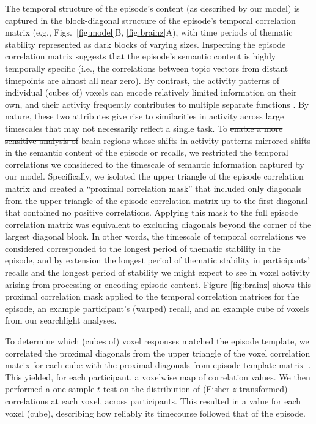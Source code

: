 \documentclass[10pt]{article}
\renewcommand{\includegraphics}[2][]{} %
\providecommand{\DIFaddtex}[1]{{\protect\color{blue}\uwave{#1}}} %
\providecommand{\DIFdeltex}[1]{{\protect\color{red}\sout{#1}}}                      %
\providecommand{\DIFaddbegin}{} %
\providecommand{\DIFaddend}{} %
\providecommand{\DIFdelbegin}{} %
\providecommand{\DIFdelend}{} %
\providecommand{\DIFadd}[1]{\texorpdfstring{\DIFaddtex{#1}}{#1}} %
\providecommand{\DIFdel}[1]{\texorpdfstring{\DIFdeltex{#1}}{}} %
\newcommand{\DIFscaledelfig}{0.5}
\newlength{\DIFdelgraphicswidth} %
\newlength{\DIFdelgraphicsheight} %
\newcommand{\DIFaddincludegraphics}[2][]{{\color{blue}\fbox{\DIFOincludegraphics[#1]{#2}}}} %
\newcommand{\DIFdelincludegraphics}[2][]{%
\sbox{\DIFdelgraphicsbox}{\DIFOincludegraphics[#1]{#2}}%
\settoboxwidth{\DIFdelgraphicswidth}{\DIFdelgraphicsbox} %
\settoboxtotalheight{\DIFdelgraphicsheight}{\DIFdelgraphicsbox} %
\scalebox{\DIFscaledelfig}{%
\parbox[b]{\DIFdelgraphicswidth}{\usebox{\DIFdelgraphicsbox}\\[-\baselineskip] \rule{\DIFdelgraphicswidth}{0em}}\llap{\resizebox{\DIFdelgraphicswidth}{\DIFdelgraphicsheight}{%
\setlength{\unitlength}{\DIFdelgraphicswidth}%
\begin{picture}(1,1)%
\thicklines\linethickness{2pt} %
{\color[rgb]{1,0,0}\put(0,0){\framebox(1,1){}}}%
{\color[rgb]{1,0,0}\put(0,0){\line( 1,1){1}}}%
{\color[rgb]{1,0,0}\put(0,1){\line(1,-1){1}}}%
\end{picture}%
}\hspace*{3pt}}} %
} %
\DeclareRobustCommand{\DIFaddbegin}{\DIFOaddbegin \let\includegraphics\DIFaddincludegraphics} %
\DeclareRobustCommand{\DIFaddend}{\DIFOaddend \let\includegraphics\DIFOincludegraphics} %
\DeclareRobustCommand{\DIFdelbegin}{\DIFOdelbegin \let\includegraphics\DIFdelincludegraphics} %
\DeclareRobustCommand{\DIFdelend}{\DIFOaddend \let\includegraphics\DIFOincludegraphics} %
\begin{document}
The temporal structure of the episode's content (as described by our model) is captured in the block-diagonal structure of the episode's temporal correlation matrix (e.g., Figs.~\ref{fig:model}B, \ref{fig:brainz}A), with time periods of thematic stability represented as dark blocks of varying sizes.  Inspecting the episode correlation matrix suggests that the episode's semantic content is highly temporally specific (i.e., the correlations between topic vectors from distant timepoints are almost all near zero).  By contrast, the activity patterns of individual (cubes of) voxels can encode relatively limited information on their own, and their activity frequently contributes to multiple separate functions \citep{FreeEtal01, SigmDeha08, CharKoec10, RishEtal13}.  By nature, these two attributes give rise to similarities in activity across large timescales that may not necessarily reflect a single task.  To \DIFdelbegin \DIFdel{enable a more sensitive analysis of }\DIFdelend \DIFaddbegin \DIFadd{identify }\DIFaddend brain regions whose shifts in activity patterns mirrored shifts in the semantic content of the episode or recalls, we restricted the temporal correlations we considered to the timescale of semantic information captured by our model.  Specifically, we isolated the upper triangle of the episode correlation matrix and created a ``proximal correlation mask'' that included only diagonals from the upper triangle of the episode correlation matrix up to the first diagonal that contained no positive correlations.  Applying this mask to the full episode correlation matrix was equivalent to excluding diagonals beyond the corner of the largest diagonal block.  In other words, the timescale of temporal correlations we considered corresponded to the longest period of thematic stability in the episode, and by extension the longest period of thematic stability in participants' recalls and the longest period of stability we might expect to see in voxel activity arising from processing or encoding episode content.  Figure \ref{fig:brainz} shows this proximal correlation mask applied to the temporal correlation matrices for the episode, an example participant's (warped) recall, and an example cube of voxels from our searchlight analyses.

To determine which (cubes of) voxel responses matched the episode template, we correlated the proximal diagonals from the upper triangle of the voxel correlation matrix for each cube with the proximal diagonals from episode template matrix~\citep{KrieEtal08b}.  This yielded, for each participant, a voxelwise map of correlation values.  We then performed a one-sample $t$-test on the distribution of (Fisher $z$-transformed) correlations at each voxel, across participants.  This resulted in a value for each voxel (cube), describing how reliably its timecourse followed that of the episode.
\end{document}
